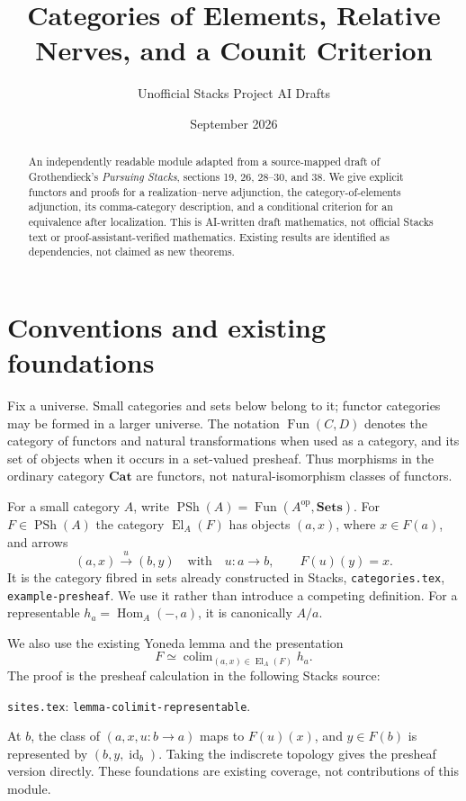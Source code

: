 \documentclass[11pt]{amsart}
\title{Categories of Elements, Relative Nerves, and a Counit Criterion}
\author{Unofficial Stacks Project AI Drafts}
\date{September 2026}
\theoremstyle{remark}
\newcommand{\PSh}{\operatorname{PSh}}
\newcommand{\El}{\operatorname{El}}
\newcommand{\Fun}{\operatorname{Fun}}
\newcommand{\Hom}{\operatorname{Hom}}
\newcommand{\Cat}{\mathbf{Cat}}
\newcommand{\Sets}{\mathbf{Sets}}
\newcommand{\id}{\operatorname{id}}
\begin{document}
\maketitle
\begin{abstract}
An independently readable module adapted from a source-mapped draft of
Grothendieck's \emph{Pursuing Stacks}, sections 19, 26, 28--30, and 38.
We give explicit functors and proofs for a realization--nerve adjunction,
the category-of-elements adjunction, its comma-category description, and
a conditional criterion for an equivalence after localization.
This is AI-written draft mathematics, not official Stacks text or
proof-assistant-verified mathematics. Existing results are identified as
dependencies, not claimed as new theorems.
\end{abstract}
\tableofcontents

\section{Conventions and existing foundations}
\label{psm-conventions}

Fix a universe. Small categories and sets below belong to it; functor
categories may be formed in a larger universe. The notation $\Fun(C,D)$
denotes the category of functors and natural transformations when used as
a category, and its set of objects when it occurs in a set-valued
presheaf. Thus morphisms in the ordinary category $\Cat$ are functors,
not natural-isomorphism classes of functors.

For a small category $A$, write $\PSh(A)=\Fun(A^{\mathrm{op}},\Sets)$.
For $F\in\PSh(A)$ the category $\El_A(F)$ has objects $(a,x)$,
where $x\in F(a)$, and arrows
\[
 (a,x)\xrightarrow{u}(b,y)\quad\text{with}\quad
 u:a\longrightarrow b,\qquad F(u)(y)=x.
\]
It is the category fibred in sets already constructed in Stacks,
\nolinkurl{categories.tex}, \nolinkurl{example-presheaf}.
We use it rather than introduce a competing definition.
For a representable $h_a=\Hom_A(-,a)$, it is canonically $A/a$.

We also use the existing Yoneda lemma and the presentation
\begin{equation}\label{psm-density}
 F\simeq\mathop{\mathrm{colim}}_{(a,x)\in\El_A(F)}h_a.
\end{equation}
The proof is the presheaf calculation in the following Stacks source:
\begin{center}\small
\nolinkurl{sites.tex}: \nolinkurl{lemma-colimit-representable}.
\end{center}
At $b$, the class of $(a,x,u:b\to a)$ maps to $F(u)(x)$,
and $y\in F(b)$ is represented by $(b,y,\id_b)$.
Taking the indiscrete topology gives the presheaf version directly.
These foundations are existing coverage, not contributions of this module.
\end{document}
